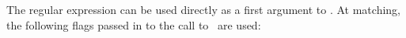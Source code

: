
The regular expression can be used directly as a first argument
to . At matching, the following flags passed in
to the call to \ are used:



